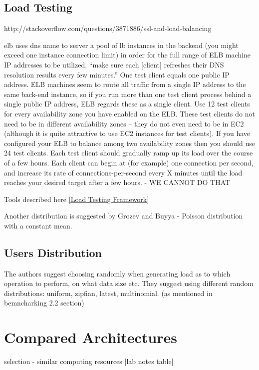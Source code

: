 \documentclass{uvamscse}
\begin{document}
\subsection{Load Testing}
http://stackoverflow.com/questions/3871886/ssl-and-load-balancing

elb uses dns name to server a pool of lb instances in the backend (you might exceed one instance connection limit)
in order for the full range of ELB machine IP addresses to be utilized, “make sure each [client] refreshes their DNS resolution results every few minutes.”
One test client equals one public IP address. ELB machines seem to route all traffic from a single IP address to the same back-end instance, so if you run more than one test client process behind a single public IP address, ELB regards these as a single client.
Use 12 test clients for every availability zone you have enabled on the ELB. These test clients do not need to be in different availability zones – they do not even need to be in EC2 (although it is quite attractive to use EC2 instances for test clients). If you have configured your ELB to balance among two availability zones then you should use 24 test clients.
Each test client should gradually ramp up its load over the course of a few hours. Each client can begin at (for example) one connection per second, and increase its rate of connections-per-second every X minutes until the load reaches your desired target after a few hours. - WE CANNOT DO THAT

Tools described here \ref{Load Testing Framework}

Another distribution is suggested by Grozev and Buyya \cite{GroBuy} - Poisson distribution with a constant mean.


\subsection{Users Distribution}
The authors suggest choosing randomly when generating load as to which operation to perform, on what data size etc. They suggest using different random distributions: uniform, zipfian, latest, multinomial\cite{Ycsb}. (as mentioned in bemncharking 2.2 section)

\section{Compared Architectures}\label{Compared Architectures}

selection - similar computing resources [lab notes table]
\end{document}
